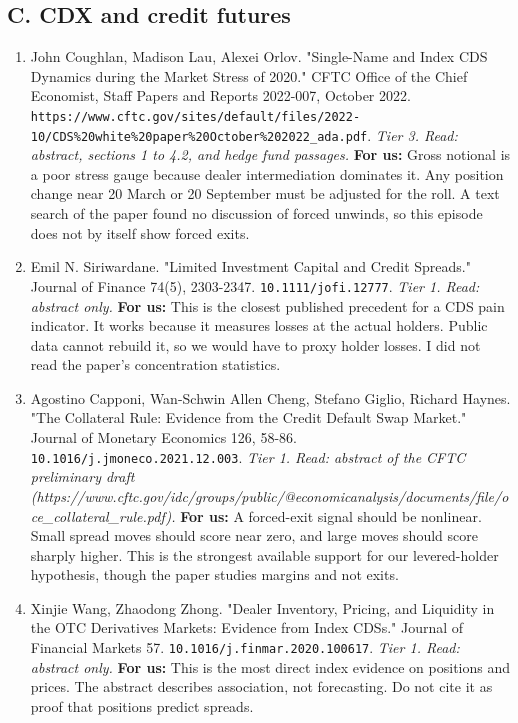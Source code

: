 \subsection*{C. CDX and credit futures}
\begin{enumerate}[leftmargin=*,itemsep=3pt]
\item John Coughlan, Madison Lau, Alexei Orlov. "Single-Name and Index CDS Dynamics during the Market Stress of 2020." CFTC Office of the Chief Economist, Staff Papers and Reports 2022-007, October 2022. \nolinkurl{https://www.cftc.gov/sites/default/files/2022-10/CDS\%20white\%20paper\%20October\%202022\_ada.pdf}. \emph{Tier 3. Read: abstract, sections 1 to 4.2, and hedge fund passages.} \textbf{For us:} Gross notional is a poor stress gauge because dealer intermediation dominates it. Any position change near 20 March or 20 September must be adjusted for the roll. A text search of the paper found no discussion of forced unwinds, so this episode does not by itself show forced exits.
\item Emil N. Siriwardane. "Limited Investment Capital and Credit Spreads." Journal of Finance 74(5), 2303-2347. \nolinkurl{10.1111/jofi.12777}. \emph{Tier 1. Read: abstract only.} \textbf{For us:} This is the closest published precedent for a CDS pain indicator. It works because it measures losses at the actual holders. Public data cannot rebuild it, so we would have to proxy holder losses. I did not read the paper's concentration statistics.
\item Agostino Capponi, Wan-Schwin Allen Cheng, Stefano Giglio, Richard Haynes. "The Collateral Rule: Evidence from the Credit Default Swap Market." Journal of Monetary Economics 126, 58-86. \nolinkurl{10.1016/j.jmoneco.2021.12.003}. \emph{Tier 1. Read: abstract of the CFTC preliminary draft (https://www.cftc.gov/idc/groups/public/@economicanalysis/documents/file/oce\_collateral\_rule.pdf).} \textbf{For us:} A forced-exit signal should be nonlinear. Small spread moves should score near zero, and large moves should score sharply higher. This is the strongest available support for our levered-holder hypothesis, though the paper studies margins and not exits.
\item Xinjie Wang, Zhaodong Zhong. "Dealer Inventory, Pricing, and Liquidity in the OTC Derivatives Markets: Evidence from Index CDSs." Journal of Financial Markets 57. \nolinkurl{10.1016/j.finmar.2020.100617}. \emph{Tier 1. Read: abstract only.} \textbf{For us:} This is the most direct index evidence on positions and prices. The abstract describes association, not forecasting. Do not cite it as proof that positions predict spreads.

\end{enumerate}
